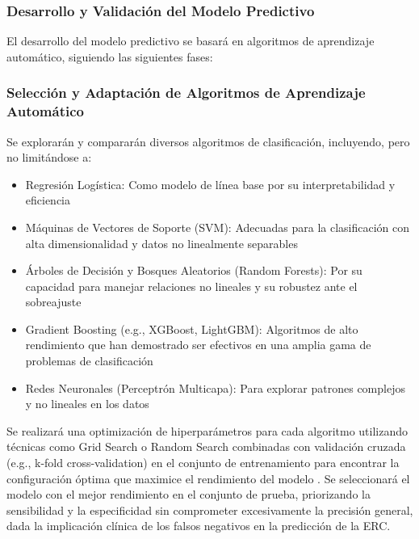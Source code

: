 \documentclass{article}
\begin{document}
\subsubsection{Desarrollo y Validación del Modelo Predictivo}

El desarrollo del modelo predictivo se basará en algoritmos
de aprendizaje automático, siguiendo las siguientes fases:

\subsubsection{Selección y Adaptación de Algoritmos de
Aprendizaje Automático}

Se explorarán y compararán diversos algoritmos de
clasificación, incluyendo, pero no limitándose a:

\begin{itemize}
    \item Regresión Logística: Como modelo de línea base por
        su interpretabilidad y eficiencia \cite{Hosmer2013}
    \item Máquinas de Vectores de Soporte (SVM): Adecuadas
        para la clasificación con alta dimensionalidad y
        datos no linealmente separables \cite{Cortes1995}
    \item Árboles de Decisión y Bosques Aleatorios (Random
        Forests): Por su capacidad para manejar relaciones
        no lineales y su robustez ante el sobreajuste
        \cite{Breiman2001}
    \item Gradient Boosting (e.g., XGBoost, LightGBM):
        Algoritmos de alto rendimiento que han demostrado
        ser efectivos en una amplia gama de problemas de
        clasificación \cite{Chen2016}
    \item Redes Neuronales (Perceptrón Multicapa): Para
        explorar patrones complejos y no lineales en los
        datos  \cite{Goodfellow2016}
\end{itemize}

Se realizará una optimización de hiperparámetros para cada
algoritmo utilizando técnicas como Grid Search o Random
Search combinadas con validación cruzada (e.g., k-fold
cross-validation) en el conjunto de entrenamiento para
encontrar la configuración óptima que maximice el
rendimiento del modelo \cite{James2013}.
Se seleccionará el modelo con el mejor rendimiento en el
conjunto de prueba, priorizando la sensibilidad y la
especificidad sin comprometer excesivamente la precisión
general, dada la implicación clínica de los falsos negativos
en la predicción de la ERC.
\end{document}
